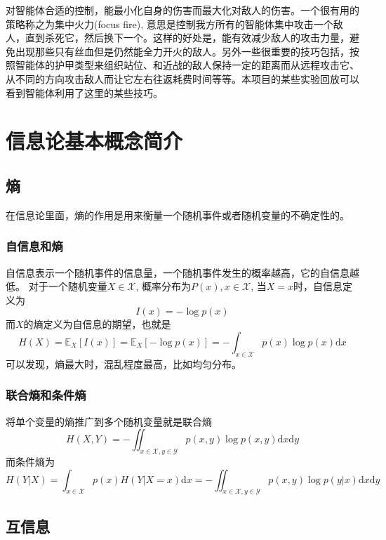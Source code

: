 对智能体合适的控制，能最小化自身的伤害而最大化对敌人的伤害。一个很有用的策略称之为集中火力(focus fire), 意思是控制我方所有的智能体集中攻击一个敌人，直到杀死它，然后换下一个。这样的好处是，能有效减少敌人的攻击力量，避免出现那些只有丝血但是仍然能全力开火的敌人。另外一些很重要的技巧包括，按照智能体的护甲类型来组织站位、和近战的敌人保持一定的距离而从远程攻击它、从不同的方向攻击敌人而让它左右往返耗费时间等等。本项目的某些实验回放可以看到智能体利用了这里的某些技巧。

\section{信息论基本概念简介}
\subsection{熵}
在信息论里面，熵的作用是用来衡量一个随机事件或者随机变量的不确定性的。

\subsubsection{自信息和熵}
自信息表示一个随机事件的信息量，一个随机事件发生的概率越高，它的自信息越低。
对于一个随机变量$X\in \mathcal{X}$, 概率分布为$P(x),x\in\mathcal{X}$, 当$X=x$时，自信息定义为
\begin{equation}
    I(x) = -\log p(x)
\end{equation}
而$X$的熵定义为自信息的期望，也就是
\begin{equation}
    H(X) = \mathbb{E}_X[I(x)] = \mathbb{E}_X[-\log p(x)]=-\int_{x\in\mathcal{X}}p(x)\log p(x)\mathrm{d}x
\end{equation}
可以发现，熵最大时，混乱程度最高，比如均匀分布。

\subsubsection{联合熵和条件熵}
将单个变量的熵推广到多个随机变量就是联合熵
\begin{equation}
    H(X,Y) = -\iint_{x\in\mathcal{X},y\in\mathcal{Y}}p(x,y)\log p(x,y)\mathrm{d}x\mathrm{d}y
\end{equation}
而条件熵为
\begin{equation}
    H(Y|X)=\int_{x\in\mathcal{X}}p(x)H(Y|X=x)\mathrm{d}x=-\iint_{x\in\mathcal{X},y\in\mathcal{Y}}p(x,y)\log p(y|x)\mathrm{d}x\mathrm{d}y
\end{equation}

\subsection{互信息}

